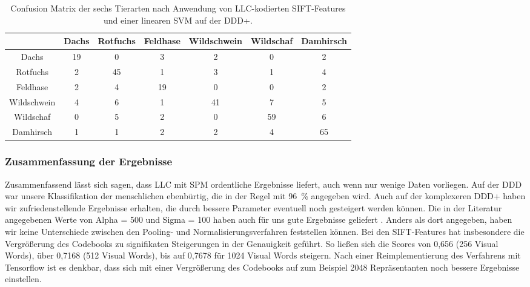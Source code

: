 \begin{table}
	\centering
	\begin{tabular}{|c|c|c|c|c|c|c|}
		\hline
		& Dachs & Rotfuchs & Feldhase & Wildschwein & Wildschaf & Damhirsch \\
		\hline
		Dachs & 19 & 0 & 3 & 2 & 0 & 2 \\ \hline
		Rotfuchs & 2 & 45 & 1 & 3 & 1 & 4 \\ \hline
		Feldhase & 2 & 4 & 19 & 0 & 0 & 2 \\ \hline
		Wildschwein & 4 & 6 & 1 & 41 & 7 & 5 \\ \hline
		Wildschaf & 0 & 5 & 2 & 0 & 59 & 6 \\ \hline
		Damhirsch & 1 & 1 & 2 & 2 & 4 & 65 \\
		\hline
	\end{tabular}
	\caption{Confusion Matrix der sechs Tierarten nach Anwendung von LLC-kodierten SIFT-Features und einer linearen SVM auf der DDD+.}
	\label{tab:ddd+}
\end{table}

\subsubsection{Zusammenfassung der Ergebnisse}

Zusammenfassend lässt sich sagen, dass LLC mit SPM ordentliche Ergebnisse liefert, auch wenn nur wenige Daten vorliegen. Auf der DDD war unsere Klassifikation der menschlichen ebenbürtig, die in der Regel mit 96~\% angegeben wird. Auch auf der komplexeren DDD+ haben wir zufriedenstellende Ergebnisse erhalten, die durch bessere Parameter eventuell noch gesteigert werden können. Die in der Literatur angegebenen Werte von Alpha = 500 und Sigma = 100 haben auch für uns gute Ergebnisse geliefert \cite{wyylhg10}. Anders als dort angegeben, haben wir keine Unterschiede zwischen den Pooling- und Normalisierungsverfahren feststellen können. Bei den SIFT-Features hat insbesondere die Vergrößerung des Codebooks zu signifikaten Steigerungen in der Genauigkeit geführt. So ließen sich die Scores von 0,656 (256 Visual Words), über 0,7168 (512 Visual Words), bis auf 0,7678 für 1024 Visual Words steigern. Nach einer Reimplementierung des Verfahrens mit Tensorflow ist es denkbar, dass sich mit einer Vergrößerung des Codebooks auf zum Beispiel 2048 Repräsentanten noch bessere Ergebnisse einstellen.